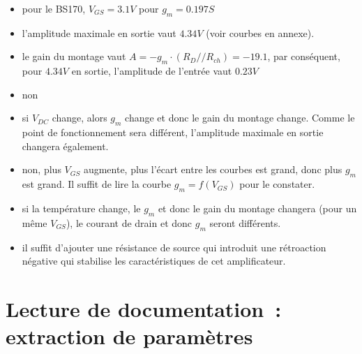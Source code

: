 \documentclass{../../template/tp}
\begin{document}
{
\begin{itemize}
\item pour le BS170, $V_{GS}=3.1V$ pour $g_m=0.197S$
\item l'amplitude maximale en sortie vaut $4.34V$ (voir courbes en annexe).
\item le gain du montage vaut $A=-g_m\cdot \left(R_D//R_{ch}\right)=-19.1$, par conséquent, pour $4.34V$ en sortie, l'amplitude de l'entrée vaut $0.23V$
\item non
\item si $V_{DC}$ change, alors $g_m$ change et donc le gain du montage change. Comme le point de fonctionnement sera différent, l'amplitude maximale en sortie changera également.
\item non, plus $V_{GS}$ augmente, plus l'écart entre les courbes est grand, donc plus $g_m$ est grand. Il suffit de lire la courbe $g_m=f(V_{GS})$ pour le constater.
\item si la température change, le $g_m$ et donc le gain du montage changera (pour un même $V_{GS}$), le courant de drain et donc $g_m$ seront différents.
\item il suffit d'ajouter une résistance de source qui introduit une rétroaction négative qui stabilise les caractéristiques de cet amplificateur. 
\end{itemize}
}

\section{Lecture de documentation~: extraction de paramètres}
\end{document}
